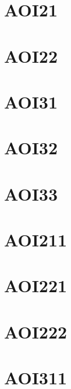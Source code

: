 \documentclass[10pt,a4paper,twoside]{report}
\begin{document}

\section{AOI21}

\clearpage

\section{AOI22}

\clearpage

\section{AOI31}

\clearpage

\section{AOI32}

\clearpage

\section{AOI33}

\clearpage

\section{AOI211}

\clearpage

\section{AOI221}

\clearpage

\section{AOI222}

\clearpage

\section{AOI311}

\clearpage
\end{document}

